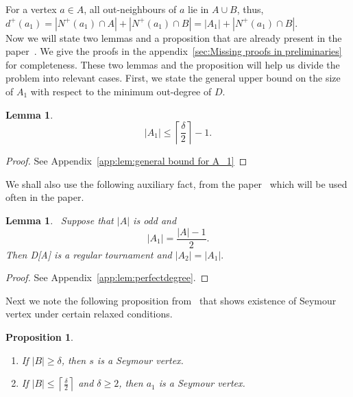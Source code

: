\documentclass[a4paper,fleqn]{cas-sc}
\newtheorem{lemma}[theorem]{Lemma}
\newtheorem{proposition}[theorem]{Proposition}
\theoremstyle{definition}
\begin{document}
For a vertex \(a\in A\), all out-neighbours of \(a\) lie in \(A\cup B\), thus, $d^+(a_{1})=|N^{+}(a_{1})\cap A|+|N^{+}(a_{1})\cap B|
=|A_{1}|+|N^{+}(a_{1})\cap B|.$ \\

Now we will state two lemmas and a proposition that are already present in the paper~\cite{KanekoLocke2001}. We give the proofs in the appendix~\ref{sec:Missing proofs in preliminaries} for completeness. These two lemmas and the proposition will help us divide the problem into relevant cases. First, we state the general upper bound on the size of  $A_1$ with respect to the minimum out-degree of $D$.

\begin{lemma}\label{lem:general bound for A_1}
\[
|A_{1}|\leq \left\lceil \frac{\delta}{2}\right\rceil-1.
\]
\end{lemma}

\begin{proof}
See Appendix~\ref{app:lem:general bound for A_1}
\end{proof}

We shall also use the following auxiliary fact,  from the paper~\cite{KanekoLocke2001} which will be used often in the paper.

\begin{lemma}~\label{lem:perfectdegree}
Suppose that \(|A|\) is odd and
\[
|A_{1}|=\frac{|A|-1}{2}.
\]
Then D[A] is a regular tournament and $|A_2|=|A_{1}|.$
\end{lemma}

\begin{proof}
See Appendix~\ref{app:lem:perfectdegree}.

\end{proof}

Next we note the following proposition from~\cite{KanekoLocke2001} that shows existence of Seymour vertex under certain relaxed conditions. 

\begin{proposition}~\label{prop:easyseymour}

\begin{enumerate}
    \item If $|B|\geq \delta$, then $s$ is a Seymour vertex.

\item If $|B|\leq \left\lceil \frac{\delta}{2}\right\rceil$
and \(\delta\geq 2\), then $a_1$ is a Seymour vertex.
\end{enumerate}
\end{proposition}
\end{document}
